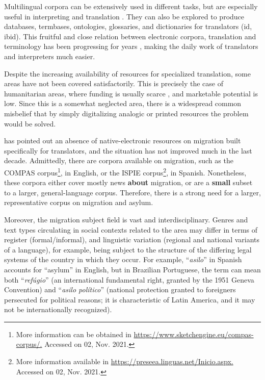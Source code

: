 \documentclass[english]{textolivre}
\begin{document}
Multilingual corpora can be extensively used in different tasks, but are especially useful in interpreting and translation \cite{mitkov_translation_2015}. They can also be explored to produce databases, termbases, ontologies, glossaries, and dictionaries for translators (id, ibid). This fruitful and close relation between electronic corpora, translation and terminology has been progressing for years \cite{bowker_working_2002}, making the daily work of translators and interpreters much easier.

Despite the increasing availability of resources for specialized translation, some areas have not been covered satisfactorily. This is precisely the case of humanitarian areas, where funding is usually scarce \cite{rico_perez_hacker_2013}, and marketable potential is low. Since this is a somewhat neglected area, there is a widespread common misbelief that by simply digitalizing analogic or printed resources the problem would be solved.

\textcite{rico_perez_tecnologias_2010, rico_perez_hacker_2013} has pointed out an absence of native-electronic resources on migration built specifically for translators, and the situation has not improved much in the last decade. Admittedly, there are corpora available on migration, such as the COMPAS corpus\footnote{More information can be obtained in \url{https://www.sketchengine.eu/compas-corpus/.} Accessed on 02, Nov. 2021.}, in English, or the ISPIE corpus\footnote{More information available in \url{https://preseea.linguas.net/Inicio.aspx.} Accessed on 02, Nov. 2021.}, in Spanish. Nonetheless, these corpora either cover mostly news \textbf{about} migration, or are a \textbf{small} subset to a larger, general-language corpus. Therefore, there is a strong need for a larger, representative corpus on migration and asylum.

Moreover, the migration subject field is vast and interdisciplinary. Genres and text types circulating in social contexts related to the area may differ in terms of register (formal/informal), and linguistic variation (regional and national variants of a language), for example, being subject to the structure of the differing legal systems of the country in which they occur. For example, “\textit{asilo}” in Spanish accounts for “asylum” in English, but in Brazilian Portuguese, the term can mean both “\textit{refúgio}” (an international fundamental right, granted by the 1951 Geneva Convention) and “\textit{asilo político}” (national protection granted to foreigners persecuted for political reasons; it is characteristic of Latin America, and it may not be internationally recognized).
\end{document}
